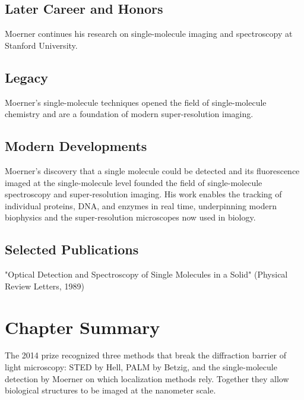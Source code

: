 \subsection*{Later Career and Honors}

Moerner continues his research on single-molecule imaging and spectroscopy at Stanford University.

\subsection*{Legacy}

Moerner's single-molecule techniques opened the field of single-molecule chemistry and are a foundation of modern super-resolution imaging.

\subsection*{Modern Developments}

Moerner's discovery that a single molecule could be detected and its fluorescence imaged at the single-molecule level founded the field of single-molecule spectroscopy and super-resolution imaging. His work enables the tracking of individual proteins, DNA, and enzymes in real time, underpinning modern biophysics and the super-resolution microscopes now used in biology.

\subsection*{Selected Publications}

"Optical Detection and Spectroscopy of Single Molecules in a Solid" (Physical Review Letters, 1989)

\clearpage

\section*{Chapter Summary}

The 2014 prize recognized three methods that break the diffraction barrier of light microscopy: STED by Hell, PALM by Betzig, and the single-molecule detection by Moerner on which localization methods rely. Together they allow biological structures to be imaged at the nanometer scale.
